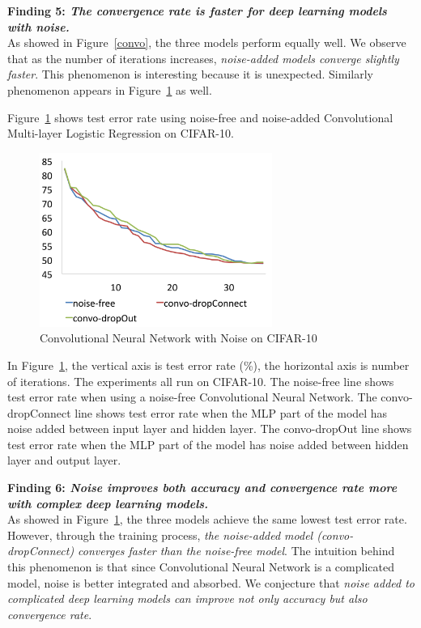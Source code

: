 {\bf Finding 5: {\em The convergence rate is faster for deep learning models
with noise.}} \\
As showed in Figure~\ref{convo}, the three models perform equally well.
We observe that as the number of iterations increases, {\em noise-added
models converge slightly faster}. This phenomenon is interesting because it is unexpected.
Similarly phenomenon appears in Figure~\ref{convo10} as well.

Figure~\ref{convo10} shows test error rate using noise-free and noise-added
Convolutional Multi-layer Logistic Regression on CIFAR-10.
\begin{figure}[!htbp]
\centering
\includegraphics[width=215pt]{f-figs/convo10.png}
\caption{Convolutional Neural Network with Noise on CIFAR-10}
\label{convo10}
\end{figure}
In Figure~\ref{convo10}, the vertical axis is test error rate (\%), the
horizontal axis is number of iterations. The experiments all run on
CIFAR-10. The noise-free line shows test error rate when using a
noise-free Convolutional Neural Network.
The convo-dropConnect line shows test error rate when the MLP part of the
model has noise added between input layer and hidden layer.
The convo-dropOut line shows test error rate when the MLP part of the model
has noise added between hidden layer and output layer.

{\bf Finding 6: {\em Noise improves both accuracy and convergence rate more with
complex deep learning models.}} \\
As showed in Figure~\ref{convo10}, the three models achieve the same lowest
test error rate. However, through the training process, {\em the
noise-added model (convo-dropConnect) converges faster than the noise-free
model}. The intuition behind this phenomenon is that since Convolutional
Neural Network is a complicated model, noise is better integrated and
absorbed. We conjecture that {\em noise added to complicated deep
learning models can improve not only accuracy but also convergence rate}.

